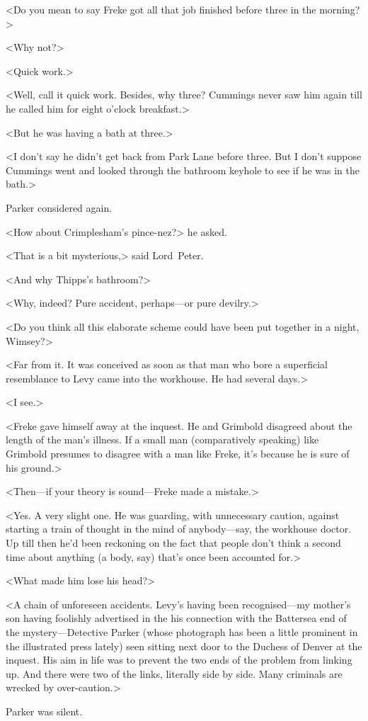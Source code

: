 <Do you mean to say Freke got all that job finished before three in the morning?>

<Why not?>

<Quick work.>

<Well, call it quick work. Besides, why three? Cummings never saw him again till he called him for eight o'clock breakfast.>

<But he was having a bath at three.>

<I don't say he didn't get back from Park Lane before three. But I don't suppose Cummings went and looked through the bathroom keyhole to see if he was in the bath.>

Parker considered again.

<How about Crimplesham's pince-nez?> he asked.

<That is a bit mysterious,> said Lord~Peter.

<And why Thipps's bathroom?>

<Why, indeed? Pure accident, perhaps—or pure devilry.>

<Do you think all this elaborate scheme could have been put together in a night, Wimsey?>

<Far from it. It was conceived as soon as that man who bore a superficial resemblance to Levy came into the workhouse. He had several days.>

<I see.>

<Freke gave himself away at the inquest. He and Grimbold disagreed about the length of the man's illness. If a small man (comparatively speaking) like Grimbold presumes to disagree with a man like Freke, it's because he is sure of his ground.>

<Then—if your theory is sound—Freke made a mistake.>

<Yes. A very slight one. He was guarding, with unnecessary caution, against starting a train of thought in the mind of anybody—say, the workhouse doctor. Up till then he'd been reckoning on the fact that people don't think a second time about anything (a body, say) that's once been accounted for.>

<What made him lose his head?>

<A chain of unforeseen accidents. Levy's having been recognised—my mother's son having foolishly advertised in the  his connection with the Battersea end of the mystery—Detective Parker (whose photograph has been a little prominent in the illustrated press lately) seen sitting next door to the Duchess of Denver at the inquest. His aim in life was to prevent the two ends of the problem from linking up. And there were two of the links, literally side by side. Many criminals are wrecked by over-caution.>

Parker was silent.